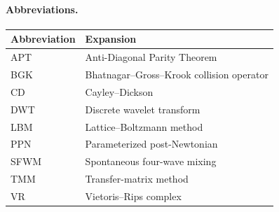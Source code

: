 \documentclass[12pt,openany]{report}
\theoremstyle{definition}
\theoremstyle{plain}
\theoremstyle{remark}
\begin{document}
\paragraph{Abbreviations.}
\begin{center}
\begin{tabular}{ll}
\toprule
\textbf{Abbreviation} & \textbf{Expansion} \\
\midrule
APT & Anti-Diagonal Parity Theorem \\
BGK & Bhatnagar--Gross--Krook collision operator \\
CD & Cayley--Dickson \\
DWT & Discrete wavelet transform \\
LBM & Lattice--Boltzmann method \\
PPN & Parameterized post-Newtonian \\
SFWM & Spontaneous four-wave mixing \\
TMM & Transfer-matrix method \\
VR & Vietoris--Rips complex \\
\bottomrule
\end{tabular}
\end{center}




\end{document}
